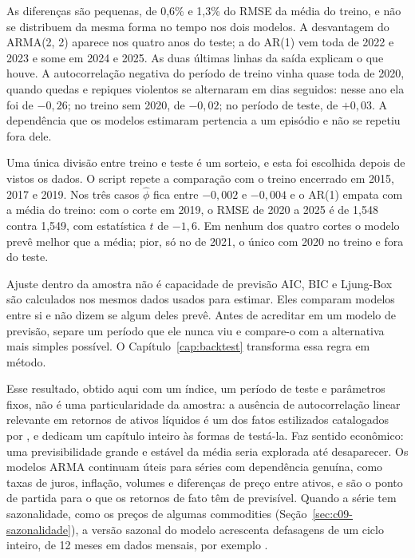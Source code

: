 As diferenças são pequenas, de 0,6\% e 1,3\% do RMSE da média do treino, e não se distribuem da mesma forma no tempo nos dois modelos. A desvantagem do ARMA(2, 2) aparece nos quatro anos do teste; a do AR(1) vem toda de 2022 e 2023 e some em 2024 e 2025. As duas últimas linhas da saída explicam o que houve. A autocorrelação negativa do período de treino vinha quase toda de 2020, quando quedas e repiques violentos se alternaram em dias seguidos: nesse ano ela foi de $-0,26$; no treino sem 2020, de $-0,02$; no período de teste, de $+0,03$. A dependência que os modelos estimaram pertencia a um episódio e não se repetiu fora dele.

Uma única divisão entre treino e teste é um sorteio, e esta foi escolhida depois de vistos os dados. O script  repete a comparação com o treino encerrado em 2015, 2017 e 2019. Nos três casos $\hat\phi$ fica entre $-0,002$ e $-0,004$ e o AR(1) empata com a média do treino: com o corte em 2019, o RMSE de 2020 a 2025 é de 1,548 contra 1,549, com estatística $t$ de $-1,6$. Em nenhum dos quatro cortes o modelo prevê melhor que a média; pior, só no de 2021, o único com 2020 no treino e fora do teste.

\begin{armadilha}{Ajuste dentro da amostra não é capacidade de previsão}
AIC, BIC e Ljung-Box são calculados nos mesmos dados usados para estimar. Eles comparam modelos entre si e não dizem se algum deles prevê. Antes de acreditar em um modelo de previsão, separe um período que ele nunca viu e compare-o com a alternativa mais simples possível. O Capítulo~\ref{cap:backtest} transforma essa regra em método.
\end{armadilha}

Esse resultado, obtido aqui com um índice, um período de teste e parâmetros fixos, não é uma particularidade da amostra: a ausência de autocorrelação linear relevante em retornos de ativos líquidos é um dos fatos estilizados catalogados por \citet{cont2001}, e \citet{campbell1997} dedicam um capítulo inteiro às formas de testá-la. Faz sentido econômico: uma previsibilidade grande e estável da média seria explorada até desaparecer. Os modelos ARMA continuam úteis para séries com dependência genuína, como taxas de juros, inflação, volumes e diferenças de preço entre ativos, e são o ponto de partida para o que os retornos de fato têm de previsível. Quando a série tem sazonalidade, como os preços de algumas commodities (Seção~\ref{sec:c09-sazonalidade}), a versão sazonal do modelo acrescenta defasagens de um ciclo inteiro, de 12 meses em dados mensais, por exemplo \citep{box2015}.

